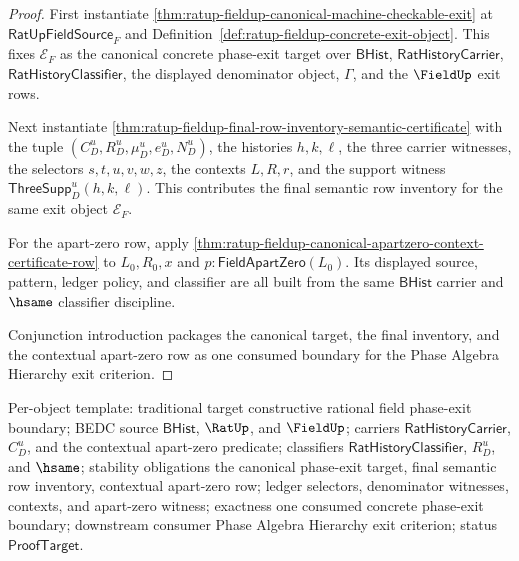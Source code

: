 \begin{proof}
First instantiate
\autoref{thm:ratup-fieldup-canonical-machine-checkable-exit} at
$\mathsf{RatUpFieldSource}_F$ and
Definition~\ref{def:ratup-fieldup-concrete-exit-object}. This fixes
$\mathcal E_F$ as the canonical concrete phase-exit target over
$\mathsf{BHist}$, $\mathsf{RatHistoryCarrier}$,
$\mathsf{RatHistoryClassifier}$, the displayed denominator object,
$\Gamma$, and the $\FieldUp$ exit rows.

Next instantiate
\autoref{thm:ratup-fieldup-final-row-inventory-semantic-certificate} with the
tuple $(C_D^u,R_D^u,\mu_D^u,e_D^u,N_D^u)$, the histories $h,k,\ell$, the
three carrier witnesses, the selectors $s,t,u,v,w,z$, the contexts $L,R,r$,
and the support witness $\mathsf{ThreeSupp}_D^u(h,k,\ell)$. This contributes
the final semantic row inventory for the same exit object $\mathcal E_F$.

For the apart-zero row, apply
\autoref{thm:ratup-fieldup-canonical-apartzero-context-certificate-row} to
$L_0,R_0,x$ and $p:\mathsf{FieldApartZero}(L_0)$. Its displayed source,
pattern, ledger policy, and classifier are all built from the same
$\mathsf{BHist}$ carrier and $\hsame$ classifier discipline.

Conjunction introduction packages the canonical target, the final inventory, and
the contextual apart-zero row as one consumed boundary for the Phase Algebra
Hierarchy exit criterion.
\end{proof}

Per-object template: traditional target constructive rational field phase-exit
boundary; BEDC source $\mathsf{BHist}$, $\RatUp$, and $\FieldUp$; carriers
$\mathsf{RatHistoryCarrier}$, $C_D^u$, and the
contextual apart-zero predicate; classifiers $\mathsf{RatHistoryClassifier}$,
$R_D^u$, and $\hsame$; stability obligations the
canonical phase-exit target, final semantic row inventory, contextual
apart-zero row; ledger selectors, denominator witnesses, contexts, and
apart-zero witness; exactness one consumed concrete phase-exit boundary;
downstream consumer Phase Algebra Hierarchy exit criterion; status
$\mathsf{ProofTarget}$.

